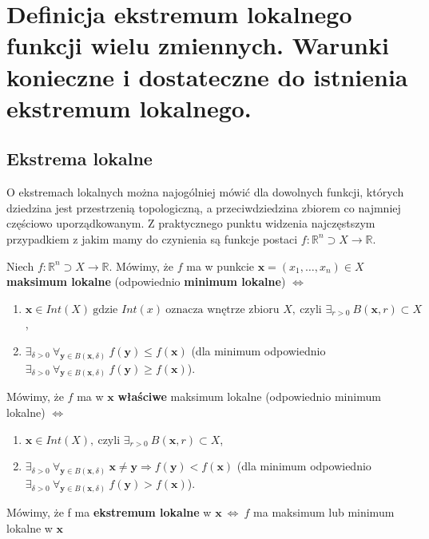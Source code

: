 \chapter{Definicja ekstremum lokalnego funkcji wielu zmiennych. Warunki konieczne i dostateczne do istnienia ekstremum lokalnego.}

\section{Ekstrema lokalne}

O ekstremach lokalnych można najogólniej mówić dla dowolnych funkcji, których dziedzina jest przestrzenią topologiczną, a przeciwdziedzina zbiorem co najmniej częściowo uporządkowanym. Z praktycznego punktu widzenia najczęstszym przypadkiem z jakim mamy do czynienia są funkcje postaci $f:\mathbb{R}^n\supset X\rightarrow\mathbb{R}$.

\begin{df}
Niech $f:\mathbb{R}^n\supset X\rightarrow\mathbb{R}$. Mówimy, że $f$ ma w punkcie $\textbf{x}=(x_1,\ldots,x_n)\in X$ \textbf{maksimum lokalne} (odpowiednio \textbf{minimum lokalne}) $\Leftrightarrow$
\begin{enumerate}[\rm 1.]
\item
$\textbf{x}\in Int(X)\ \textrm{gdzie } Int(x)\ \textrm{oznacza wnętrze zbioru } X,\ \textrm{czyli } \exists_{r>0}\ B(\textbf{x},r)\subset X$,
\item
$\exists_{\delta>0}\ \forall_{\textbf{y}\in B(\textbf{x},\delta)}\ f(\textbf{y})\leq f(\textbf{x})$ (dla minimum odpowiednio $\exists_{\delta>0}\ \forall_{\textbf{y}\in B(\textbf{x},\delta)}\ f(\textbf{y})\geq f(\textbf{x})$).
\end{enumerate}
Mówimy, że $f$ ma w $\textbf{x}$ \textbf{właściwe} maksimum lokalne (odpowiednio minimum lokalne) $\Leftrightarrow$
\begin{enumerate}[\rm 1.]
\item
$\textbf{x}\in Int(X),\ \textrm{czyli } \exists_{r>0}\ B(\textbf{x},r)\subset X$,
\item
$\exists_{\delta>0}\ \forall_{\textbf{y}\in B(\textbf{x},\delta)}\ \textbf{x}\neq\textbf{y}\Rightarrow f(\textbf{y})<f(\textbf{x})$ (dla minimum odpowiednio $\exists_{\delta>0}\ \forall_{\textbf{y}\in B(\textbf{x},\delta)}\ f(\textbf{y})>f(\textbf{x})$).
\end{enumerate}
Mówimy, że f ma \textbf{ekstremum lokalne} w $\textbf{x}\ \Leftrightarrow\ f$ ma maksimum lub minimum lokalne w $\textbf{x}$
\end{df}

